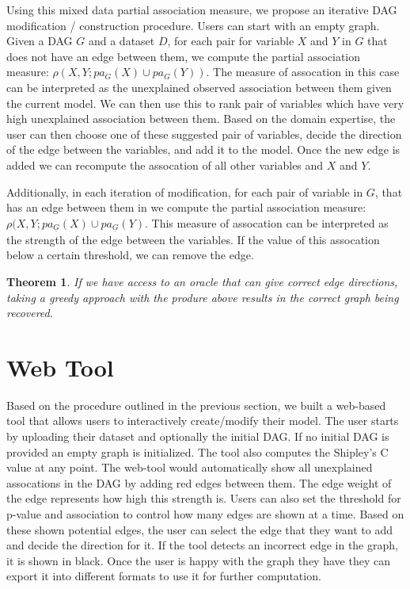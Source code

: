 \documentclass[letterpaper]{article} %
\newtheorem{theorem}{Theorem}
\begin{document}

Using this mixed data partial association measure, we propose an iterative DAG
modification / construction procedure. Users can start with an empty graph.
Given a DAG $ G $ and a dataset $ D $, for each pair for variable $ X $ and $ Y
$ in $ G $ that does not have an edge between them, we compute the partial
association measure: $ \rho(X, Y; pa_G(X) \cup pa_G(Y)) $. The measure of
assocation in this case can be interpreted as the unexplained observed
association between them given the current model. We can then use this to rank
pair of variables which have very high unexplained association between them.
Based on the domain expertise, the user can then choose one of these suggested
pair of variables, decide the direction of the edge between the variables, and
add it to the model. Once the new edge is added we can recompute the assocation
of all other variables and $ X $ and $ Y $.

Additionally, in each iteration of modification, for each pair of variable in $
G $, that has an edge between them in we compute the partial association
measure: $ \rho(X, Y; pa_{\underline{G}}(X) \cup pa_{\underline{G}}(Y) $. This
measure of assocation can be interpreted as the strength of the edge between
the variables. If the value of this assocation below a certain threshold, we
can remove the edge.

\begin{theorem}
	If we have access to an oracle that can give correct edge directions, taking a
	greedy approach with the produre above results in the correct graph
	being recovered.
\end{theorem}

\section{Web Tool}
\label{sec:web}
Based on the procedure outlined in the previous section, we built a web-based
tool that allows users to interactively create/modify their model. The user
starts by uploading their dataset and optionally the initial DAG. If no initial
DAG is provided an empty graph is initialized. The tool also computes the
Shipley's C value at any point. The web-tool would automatically show all
unexplained assocations in the DAG by adding red edges between them. The edge
weight of the edge represents how high this strength is. Users can also set the
threshold for p-value and association to control how many edges are shown at a
time. Based on these shown potential edges, the user can select the edge that
they want to add and decide the direction for it. If the tool detects an
incorrect edge in the graph, it is shown in black. Once the user is happy with
the graph they have they can export it into different formats to use it for
further computation.
\end{document}
